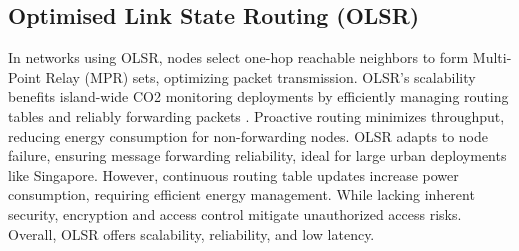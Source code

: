 
\subsection{Optimised Link State Routing (OLSR)}\label{sec:lr_oslr}

In networks using OLSR, nodes select one-hop reachable neighbors to form Multi-Point Relay (MPR) sets, optimizing packet transmission. OLSR's scalability benefits island-wide CO2 monitoring deployments by efficiently managing routing tables and reliably forwarding packets\cite{Kakade2017Performance} \cite{OLSR_IETF} \cite{Ahn2014}. Proactive routing minimizes throughput, reducing energy consumption for non-forwarding nodes\cite{Guo_2011}. OLSR adapts to node failure, ensuring message forwarding reliability, ideal for large urban deployments like Singapore. However, continuous routing table updates increase power consumption, requiring efficient energy management\cite{Wheeb_Nordin_Samah_Kanellopoulos_2023}. While lacking inherent security, encryption and access control mitigate unauthorized access risks. Overall, OLSR offers scalability, reliability, and low latency.




